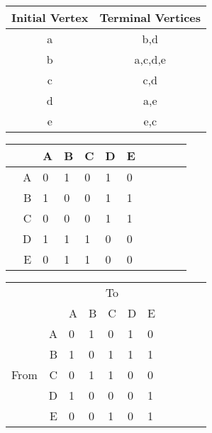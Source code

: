 \documentclass[12pt]{article}
\newenvironment{problem}[2][Problem]{\begin{trivlist}
\item[\hskip \labelsep {\bfseries #1}\hskip \labelsep {\bfseries #2.}]}{\end{trivlist}}
\begin{document}
\begin{problem}{10.3.4}
\end{problem}

\begin{center}
    \begin{tabular}{ |c|c| } 
    \hline
    Initial Vertex & Terminal Vertices \\
    \hline
    a & b,d \\ 
    b & a,c,d,e \\ 
    c & c,d \\ 
    d & a,e \\ 
    e & e,c \\ 
    \hline
    \end{tabular}
\end{center}

\begin{problem}{10.3.6}
\end{problem}

\begin{tabular}{|lr|l|l|l|l|l|l|l|l|l|} \cline{3-7}
\multicolumn{1}{l}{} & & A & B & C & D & E \\ \hline
& \multicolumn{1}{|r|}{A} & 0 & 1 & 0 & 1 & 0 \\ \cline{2-7}
& \multicolumn{1}{|r|}{B} & 1 & 0 & 0 & 1 & 1 \\ \cline{2-7}
& \multicolumn{1}{|r|}{C} & 0 & 0 & 0 & 1 & 1 \\ \cline{2-7}
& \multicolumn{1}{|r|}{D} & 1 & 1 & 1 & 0 & 0 \\ \cline{2-7}
& \multicolumn{1}{|r|}{E} & 0 & 1 & 1 & 0 & 0 \\ \hline
\end{tabular}

\begin{problem}{10.3.8}
\end{problem}

\begin{tabular}{|lr|l|l|l|l|l|l|l|l|l|} \cline{3-7}
\multicolumn{1}{l}{} && \multicolumn{5}{c|}{To} \\ \cline{3-7}
\multicolumn{1}{l}{} & & A & B & C & D & E \\ \hline
\multirow{5}{*}{\begin{sideways}From\end{sideways}}
& \multicolumn{1}{|r|}{A} & 0 & 1 & 0 & 1 & 0 \\ \cline{2-7}
& \multicolumn{1}{|r|}{B} & 1 & 0 & 1 & 1 & 1 \\ \cline{2-7}
& \multicolumn{1}{|r|}{C} & 0 & 1 & 1 & 0 & 0 \\ \cline{2-7}
& \multicolumn{1}{|r|}{D} & 1 & 0 & 0 & 0 & 1 \\ \cline{2-7}
& \multicolumn{1}{|r|}{E} & 0 & 0 & 1 & 0 & 1 \\ \hline
\end{tabular}
\end{document}

